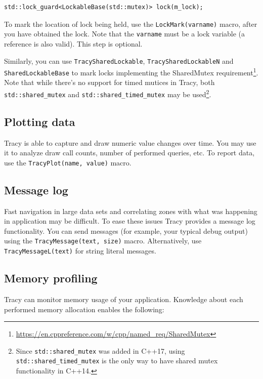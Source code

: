 \documentclass[hidelinks,titlepage,a4paper]{article}
\begin{document}
\begin{lstlisting}
std::lock_guard<LockableBase(std::mutex)> lock(m_lock);
\end{lstlisting}

To mark the location of lock being held, use the \texttt{LockMark(varname)} macro, after you have obtained the lock. Note that the \texttt{varname} must be a lock variable (a reference is also valid). This step is optional.

Similarly, you can use \texttt{TracySharedLockable}, \texttt{TracySharedLockableN} and \texttt{SharedLockableBase} to mark locks implementing the SharedMutex requirement\footnote{\url{https://en.cppreference.com/w/cpp/named_req/SharedMutex}}. Note that while there's no support for timed mutices in Tracy, both \texttt{std::shared\_mutex} and \texttt{std::shared\_timed\_mutex} may be used\footnote{Since \texttt{std::shared\_mutex} was added in C++17, using \texttt{std::shared\_timed\_mutex} is the only way to have shared mutex functionality in C++14.}.

\subsection{Plotting data}

Tracy is able to capture and draw numeric value changes over time. You may use it to analyze draw call counts, number of performed queries, etc. To report data, use the \texttt{TracyPlot(name, value)} macro.

\subsection{Message log}
\label{messagelog}

Fast navigation in large data sets and correlating zones with what was happening in application may be difficult. To ease these issues Tracy provides a message log functionality. You can send messages (for example, your typical debug output) using the \texttt{TracyMessage(text, size)} macro. Alternatively, use \texttt{TracyMessageL(text)} for string literal messages.

\subsection{Memory profiling}
\label{memoryprofiling}

Tracy can monitor memory usage of your application. Knowledge about each performed memory allocation enables the following:
\end{document}

